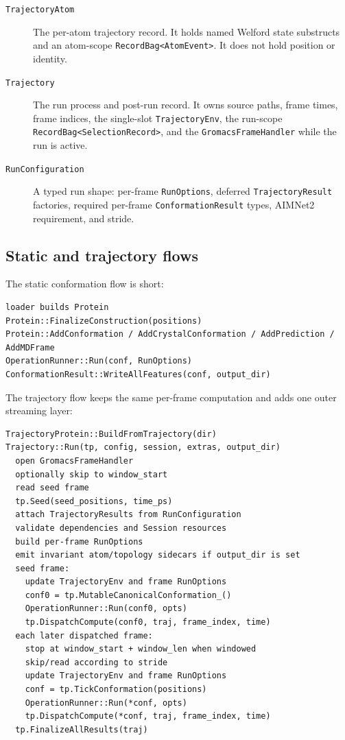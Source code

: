 \documentclass[11pt]{article}
\newcommand{\code}[1]{\texttt{#1}}
\begin{document}
\begin{description}
\item[\code{TrajectoryAtom}] The per-atom trajectory record. It holds named
Welford state substructs and an atom-scope \code{RecordBag<AtomEvent>}. It
does not hold position or identity.

\item[\code{Trajectory}] The run process and post-run record. It owns source
paths, frame times, frame indices, the single-slot \code{TrajectoryEnv}, the
run-scope \code{RecordBag<SelectionRecord>}, and the
\code{GromacsFrameHandler} while the run is active.

\item[\code{RunConfiguration}] A typed run shape: per-frame
\code{RunOptions}, deferred \code{TrajectoryResult} factories, required
per-frame \code{ConformationResult} types, AIMNet2 requirement, and stride.
\end{description}

\subsection{Static and trajectory flows}

The static conformation flow is short:

\begin{lstlisting}
loader builds Protein
Protein::FinalizeConstruction(positions)
Protein::AddConformation / AddCrystalConformation / AddPrediction / AddMDFrame
OperationRunner::Run(conf, RunOptions)
ConformationResult::WriteAllFeatures(conf, output_dir)
\end{lstlisting}

The trajectory flow keeps the same per-frame computation and adds one outer
streaming layer:

\begin{lstlisting}
TrajectoryProtein::BuildFromTrajectory(dir)
Trajectory::Run(tp, config, session, extras, output_dir)
  open GromacsFrameHandler
  optionally skip to window_start
  read seed frame
  tp.Seed(seed_positions, time_ps)
  attach TrajectoryResults from RunConfiguration
  validate dependencies and Session resources
  build per-frame RunOptions
  emit invariant atom/topology sidecars if output_dir is set
  seed frame:
    update TrajectoryEnv and frame RunOptions
    conf0 = tp.MutableCanonicalConformation_()
    OperationRunner::Run(conf0, opts)
    tp.DispatchCompute(conf0, traj, frame_index, time)
  each later dispatched frame:
    stop at window_start + window_len when windowed
    skip/read according to stride
    update TrajectoryEnv and frame RunOptions
    conf = tp.TickConformation(positions)
    OperationRunner::Run(*conf, opts)
    tp.DispatchCompute(*conf, traj, frame_index, time)
  tp.FinalizeAllResults(traj)
\end{lstlisting}
\end{document}
